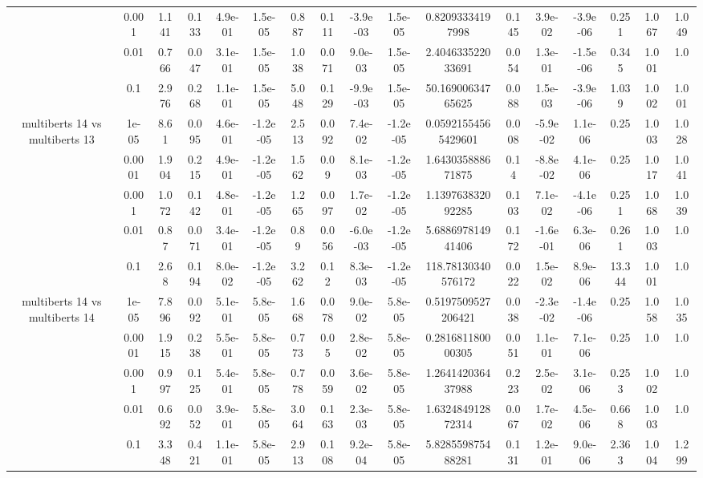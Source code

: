\begin{tabular}{|c|c|c|c|c|c|c|c|c|c|c|c|c|c|c|c|c|}
 & 0.001 & 1.141 & 0.133 & 4.9e-01 & 1.5e-05 & 0.887 & 0.111 & -3.9e-03 & 1.5e-05 & 0.82093334197998 & 0.145 & 3.9e-02 & -3.9e-06 & 0.251 & 1.067 & 1.049 \\
 & 0.01 & 0.766 & 0.047 & 3.1e-01 & 1.5e-05 & 1.038 & 0.071 & 9.0e-03 & 1.5e-05 & 2.404633522033691 & 0.054 & 1.3e-01 & -1.5e-06 & 0.345 & 1.001 & 1.0 \\
 & 0.1 & 2.976 & 0.268 & 1.1e-01 & 1.5e-05 & 5.048 & 0.129 & -9.9e-03 & 1.5e-05 & 50.16900634765625 & 0.088 & 1.5e-03 & -3.9e-06 & 1.039 & 1.002 & 1.001 \\
\hline
\multirow{5}{*}{multiberts 14 vs multiberts 13} & 1e-05 & 8.61 & 0.095 & 4.6e-01 & -1.2e-05 & 2.513 & 0.092 & 7.4e-02 & -1.2e-05 & 0.05921554565429601 & 0.008 & -5.9e-02 & 1.1e-06 & 0.25 & 1.003 & 1.028 \\
 & 0.0001 & 1.904 & 0.215 & 4.9e-01 & -1.2e-05 & 1.562 & 0.09 & 8.1e-03 & -1.2e-05 & 1.643035888671875 & 0.14 & -8.8e-02 & 4.1e-06 & 0.25 & 1.017 & 1.041 \\
 & 0.001 & 1.072 & 0.142 & 4.8e-01 & -1.2e-05 & 1.265 & 0.097 & 1.7e-02 & -1.2e-05 & 1.139763832092285 & 0.103 & 7.1e-02 & -4.1e-06 & 0.251 & 1.068 & 1.039 \\
 & 0.01 & 0.87 & 0.071 & 3.4e-01 & -1.2e-05 & 0.89 & 0.056 & -6.0e-03 & -1.2e-05 & 5.688697814941406 & 0.172 & -1.6e-01 & 6.3e-06 & 0.261 & 1.003 & 1.0 \\
 & 0.1 & 2.68 & 0.194 & 8.0e-02 & -1.2e-05 & 3.262 & 0.12 & 8.3e-03 & -1.2e-05 & 118.78130340576172 & 0.022 & 1.5e-02 & 8.9e-06 & 13.344 & 1.001 & 1.0 \\
\hline
\multirow{5}{*}{multiberts 14 vs multiberts 14} & 1e-05 & 7.896 & 0.092 & 5.1e-01 & 5.8e-05 & 1.668 & 0.078 & 9.0e-02 & 5.8e-05 & 0.5197509527206421 & 0.038 & -2.3e-02 & -1.4e-06 & 0.25 & 1.058 & 1.035 \\
 & 0.0001 & 1.915 & 0.238 & 5.5e-01 & 5.8e-05 & 0.773 & 0.05 & 2.8e-02 & 5.8e-05 & 0.281681180000305 & 0.051 & 1.1e-01 & 7.1e-06 & 0.25 & 1.0 & 1.0 \\
 & 0.001 & 0.997 & 0.125 & 5.4e-01 & 5.8e-05 & 0.778 & 0.059 & 3.6e-02 & 5.8e-05 & 1.264142036437988 & 0.223 & 2.5e-02 & 3.1e-06 & 0.253 & 1.002 & 1.0 \\
 & 0.01 & 0.692 & 0.052 & 3.9e-01 & 5.8e-05 & 3.064 & 0.163 & 2.3e-03 & 5.8e-05 & 1.632484912872314 & 0.067 & 1.7e-02 & 4.5e-06 & 0.668 & 1.003 & 1.0 \\
 & 0.1 & 3.348 & 0.421 & 1.1e-01 & 5.8e-05 & 2.913 & 0.108 & 9.2e-04 & 5.8e-05 & 5.828559875488281 & 0.131 & 1.2e-01 & 9.0e-06 & 2.363 & 1.004 & 1.299 \\

\end{tabular}
